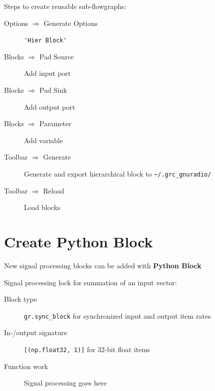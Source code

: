 \documentclass[10pt]{article}
\begin{document}
\begin{multicols*}{3}
Steps to create reusable sub-flowgraphs:

\begin{description}
\item[Options $\Rightarrow$ Generate Options] \verb|'Hier Block'|
\item[Blocks $\Rightarrow$ Pad Source] Add input port
\item[Blocks $\Rightarrow$ Pad Sink] Add output port
\item[Blocks $\Rightarrow$ Parameter] Add variable
\item[Toolbar $\Rightarrow$ Generate] Generate and export hierarchical block  to \verb|~/.grc_gnuradio/|
\item[Toolbar $\Rightarrow$ Reload] Load blocks
\end{description}

\section*{Create Python Block}

New signal processing blocks can be added with \textbf{Python Block}


Signal processing lock for summation of an input vector:
\begin{description}
\item[Block type] \verb|gr.sync_block| for synchronized input and output item rates

\item[In-/output signature] \verb|[(np.float32, 1)]| for 32-bit float items

\item[Function work] Signal processing goes here
\end{description}

%
%
%


\end{multicols*}
\end{document}
